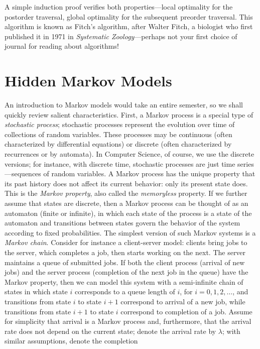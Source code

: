 \documentclass[11pt]{article}
\begin{document}
A simple induction proof verifies both properties---local optimality for the
postorder traversal, global optimality for the subsequent preorder traversal.
This algorithm is known as Fitch's algorithm, after Walter Fitch, a biologist
who first published it in 1971 in \emph{Systematic Zoology}---perhaps not
your first choice of journal for reading about algorithms!

\section{Hidden Markov Models}
An introduction to Markov models would take an entire semester, so we
shall quickly review salient characteristics.
First, a Markov process is a special type of \emph{stochastic process};
stochastic processes represent the evolution over time of collections of
random variables.  These processes may be continuous (often characterized by
differential equations) or discrete (often characterized
by recurrences or by automata).  In Computer Science, of course, we use
the discrete versions; for instance, with discrete time, stochastic
processes are just time series---sequences of random variables.
A Markov process has the unique property that its past history does not
affect its current behavior: only its present state does.  This is the
\emph{Markov property}, also called the \emph{memoryless} property.
If we further
assume that states are discrete, then a Markov process can be thought of
as an automaton (finite or infinite), in which each state of the process
is a state of the automaton and transitions between states govern the behavior
of the system according to fixed probabilities.  The simplest version of such
Markov systems is a \emph{Markov chain}.
Consider for instance a client-server model:
clients bring jobs to the server, which completes a job, then starts working
on the next.  The server maintains a queue of submitted jobs.  If both
the client process (arrival of new jobs) and the server process (completion
of the next job in the queue) have the Markov property, then we can
model this system with a semi-infinite chain of states in which
state $i$ corresponds to a queue length of $i$, for $i=0,1,2,\ldots$, and
transitions from state $i$ to state $i+1$ correspond to arrival of a new
job, while transitions from state $i+1$ to state $i$ correspond to completion
of a job.  Assume for simplicity that arrival is a Markov process and, furthermore, that the arrival rate does not depend on the current state; denote the
arrival rate by $\lambda$; with similar assumptions, denote the completion
\end{document}
